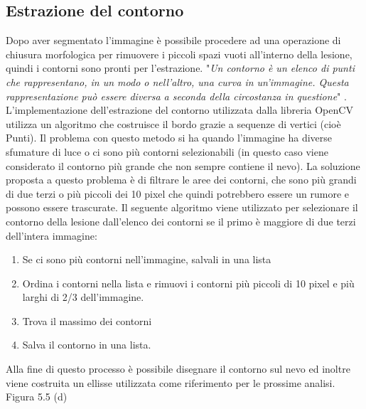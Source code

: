 {\subsection{Estrazione del contorno}
Dopo aver segmentato l'immagine è possibile procedere ad una operazione di chiusura morfologica per rimuovere i piccoli spazi vuoti all'interno della lesione, quindi i contorni sono pronti per l'estrazione. 
\newline
"\textit{Un contorno è un elenco di punti che rappresentano, in un modo o nell'altro, una curva in un'immagine. Questa rappresentazione può essere diversa a seconda della circostanza in questione}" \cite{bradski2008learning}.
L'implementazione dell'estrazione del contorno utilizzata dalla libreria OpenCV utilizza un algoritmo che costruisce il bordo \cite{suzuki1985topological} grazie a sequenze di vertici (cioè Punti).
\newline
Il problema con questo metodo si ha quando l'immagine ha diverse sfumature di luce o ci sono più contorni selezionabili (in questo caso viene considerato il contorno più grande che non sempre contiene il nevo).
\newline
La soluzione proposta a questo problema è di filtrare le aree dei contorni, che sono più grandi di due terzi o più piccoli dei 10 pixel che quindi potrebbero essere un rumore e possono essere trascurate. 
\newline
Il seguente algoritmo viene utilizzato per selezionare il contorno della lesione dall'elenco dei contorni se il primo è maggiore di due terzi dell'intera immagine:
\begin{enumerate}
	\item Se ci sono più contorni nell'immagine, salvali in una lista
	\item Ordina i contorni nella lista e rimuovi i contorni più piccoli di 10 pixel e più larghi di 2/3 dell'immagine.
	\item Trova il massimo dei contorni
	\item Salva il contorno in una lista.
\end{enumerate}
Alla fine di questo processo è possibile disegnare il contorno sul nevo ed inoltre viene costruita un ellisse utilizzata come riferimento per le prossime analisi. Figura 5.5 (d)
	\begin{figure}[h]
	\begin{center}

\end{center}
\end{figure}}
